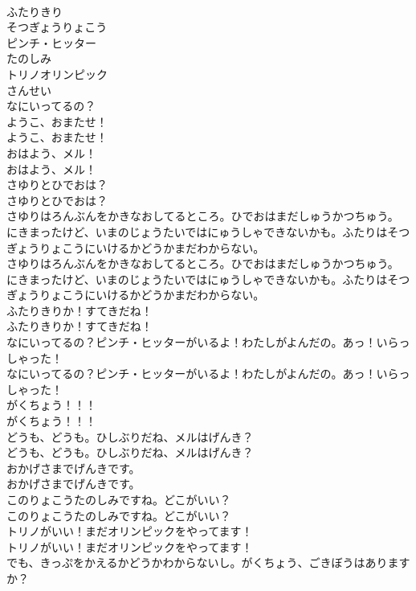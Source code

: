 \documentclass[8pt]{extreport}
\begin{document}
\begin{CJK}{UTF8}{min}
\\	ふたりきり
\\	そつぎょうりょこう
\\	ピンチ・ヒッター
\\	たのしみ
\\	トリノオリンピック
\\	さんせい
\\	なにいってるの？
\\	ようこ、おまたせ！
\\	ようこ、おまたせ！
\\	おはよう、メル！
\\	おはよう、メル！
\\	さゆりとひでおは？
\\	さゆりとひでおは？
\\	さゆりはろんぶんをかきなおしてるところ。ひでおはまだしゅうかつちゅう。
\\	にきまったけど、いまのじょうたいではにゅうしゃできないかも。ふたりはそつぎょうりょこうにいけるかどうかまだわからない。
\\	さゆりはろんぶんをかきなおしてるところ。ひでおはまだしゅうかつちゅう。
\\	にきまったけど、いまのじょうたいではにゅうしゃできないかも。ふたりはそつぎょうりょこうにいけるかどうかまだわからない。
\\	ふたりきりか！すてきだね！
\\	ふたりきりか！すてきだね！
\\	なにいってるの？ピンチ・ヒッターがいるよ！わたしがよんだの。あっ！いらっしゃった！
\\	なにいってるの？ピンチ・ヒッターがいるよ！わたしがよんだの。あっ！いらっしゃった！
\\	がくちょう！！！
\\	がくちょう！！！
\\	どうも、どうも。ひしぶりだね、メルはげんき？
\\	どうも、どうも。ひしぶりだね、メルはげんき？
\\	おかげさまでげんきです。
\\	おかげさまでげんきです。
\\	このりょこうたのしみですね。どこがいい？
\\	このりょこうたのしみですね。どこがいい？
\\	トリノがいい！まだオリンピックをやってます！
\\	トリノがいい！まだオリンピックをやってます！
\\	でも、きっぷをかえるかどうかわからないし。がくちょう、ごきぼうはありますか？

\end{CJK}
\end{document}
